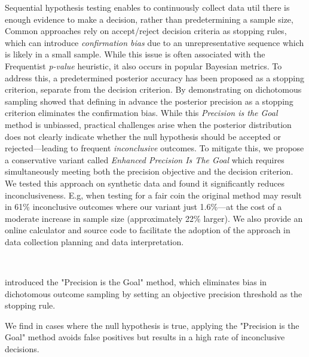 Sequential hypothesis testing enables to continuously collect data util there is enough
evidence to make a decision, rather than predetermining a sample
size, 
Common approaches rely on accept/reject decision criteria as stopping rules,
which can introduce {\it confirmation bias} due to an unrepresentative sequence which is
likely in a small sample.
While this issue is often associated with the Frequentist {\it p-value} heuristic,
it also occurs in popular Bayesian metrics.
To address this, a predetermined posterior accuracy has been proposed
as a stopping criterion, separate from the decision criterion.
By demonstrating on dichotomous sampling \cite{kruschke2015doing} showed that defining in advance the
posterior precision as a stopping criterion eliminates the confirmation bias.
While this {\it Precision is the Goal} method is unbiassed,
practical challenges arise when the posterior distribution does not clearly indicate
whether the null hypothesis should be accepted or rejected—leading to frequent {\it inconclusive}
outcomes.
To mitigate this, we propose a conservative variant called
{\it Enhanced Precision Is The Goal} which requires simultaneously meeting both the
precision objective and the decision criterion.
We tested this approach on synthetic data and found it significantly reduces
inconclusiveness. E.g, when testing for a fair coin the original method may result in 61\%
inconclusive outcomes where our variant just 1.6\%—at the cost of a moderate increase in sample
size (approximately 22\% larger).
We also provide an online calculator and source code to facilitate the adoption of the
approach in data collection planning and data interpretation.


\
\

\cite{kruschke2015doing} introduced the "Precision is the Goal" method,
which eliminates bias in dichotomous outcome sampling by setting an objective precision threshold as the stopping rule.

We find in cases where the null hypothesis is true,
applying the "Precision is the Goal" method avoids false positives but results in a high rate of inconclusive decisions.


\
\


